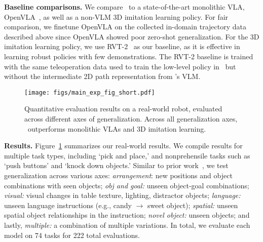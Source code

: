 
\textbf{Baseline comparisons.} We compare \method\ to a state-of-the-art monolithic VLA, OpenVLA~\citep{kim2024openvla}, as well as a non-VLM 3D imitation learning policy. For fair comparison, we finetune OpenVLA on the collected in-domain trajectory data described above since OpenVLA showed poor zero-shot generalization. For the 3D imitation learning policy, we use RVT-2~\citep{goyal2024rvt} as our baseline, as it is effective in learning robust policies with few demonstrations. The RVT-2 baseline is trained with the same teleoperation data used to train the low-level policy in \method\ but without the intermediate 2D path representation from \method 's VLM.

\begin{figure}[!tb]
    \centering
    \texttt{[image: figs/main\_exp\_fig\_short.pdf]}
    \caption{\footnotesize{Quantitative evaluation results on a real-world robot, evaluated across different axes of generalization. Across all generalization axes, \method \ outperforms monolithic VLAs and 3D imitation learning.}}
    \label{fig:experiments:main_exp}
    \vspace{-4mm}
\end{figure}

\textbf{Results.} Figure~\ref{fig:experiments:main_exp} summarizes our real-world results. We compile results for multiple task types, including `pick and place,' and nonprehensile tasks such as `push buttons' and `knock down objects.' Similar to prior work~\citep{kim2024openvla}, we test generalization across various axes: \emph{arrangement}: new positions and object combinations with seen objects; \emph{obj and goal:} unseen object-goal combinations; \emph{visual:} visual changes in table texture, lighting, distractor objects; \emph{language:} unseen language instructions (e.g., candy $\rightarrow$ sweet object); \emph{spatial:} unseen spatial object relationships in the instruction; \emph{novel object:} unseen objects; and lastly, \emph{multiple:} a combination of multiple variations. 
In total, we evaluate each model on 74 tasks for 222 total evaluations.

